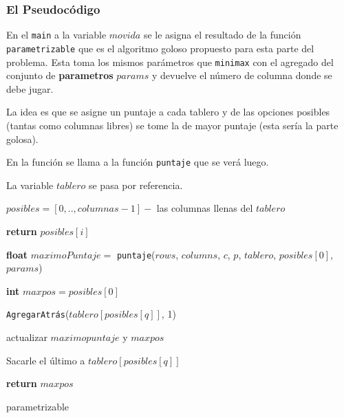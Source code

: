 \documentclass[A4paper,oneside,fleqn,11pt]{article}
\theoremstyle{definition}
\begin{document}
\subsubsection{El Pseudocódigo}
En el \texttt{main} a la variable $movida$ se le asigna el resultado de la función \texttt{parametrizable} que es el algoritmo goloso propuesto para esta parte del problema. Esta toma los mismos parámetros que \texttt{minimax} con el agregado del conjunto de \textbf{parametros} $params$ y devuelve el número de columna donde se debe jugar.

La idea es que se asigne un puntaje a cada tablero y de las opciones posibles (tantas como columnas libres) se tome la de mayor puntaje (esta sería la parte golosa).

En la función se llama a la función \texttt{puntaje} que se verá luego.

La variable $tablero$ se pasa por referencia.
\begin{algorithm}


    
    	$posibles = [0,..,columnas-1] -$ las columnas llenas del $tablero$

    	\For{$i \leftarrow [0,..,\lvert posibles \rvert$)}
    		{

    			{
    			\textbf{return} $posibles[i]$
    			}
    		}

    	\textbf{float} $maximoPuntaje =$ \texttt{puntaje}($rows$, $columns$, $c$, $p$, $tablero$, $posibles[0]$, $params$)

    	\textbf{int} $maxpos = posibles[0]$
    	
    	\For{$q \leftarrow [1,..,\lvert posibles \rvert$)}
    		{

			\texttt{AgregarAtrás}($tablero[posibles[q]]$, 1)

				{
				actualizar $maximopuntaje$ y $maxpos$
				}

			Sacarle el último a $tablero[posibles[q]]$		
			}

		\textbf{return} $maxpos$
    
    
    \caption{parametrizable}

\end{algorithm}
\end{document}
